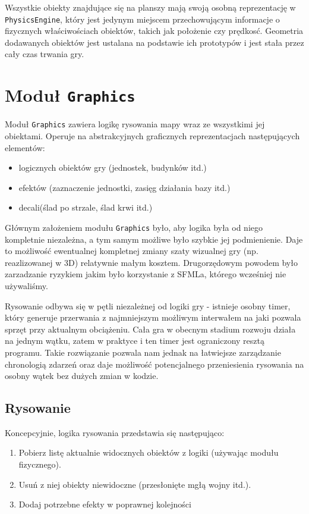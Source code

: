 \documentclass[licencjacka]{pracamgr}
\begin{document}
    Wszystkie obiekty znajdujące się na planszy mają swoją osobną reprezentację w \texttt{PhysicsEngine}, który jest jedynym miejscem
    przechowującym informacje o fizycznych właściwościach obiektów, takich jak położenie czy prędkosć. Geometria dodawanych obiektów
    jest ustalana na podstawie ich prototypów i jest stała przez cały czas trwania gry.

  \section{Moduł \texttt{Graphics}}
    Moduł \texttt{Graphics} zawiera logikę rysowania mapy wraz ze wszystkimi jej obiektami. Operuje na
    abstrakcyjnych graficznych reprezentacjach następujących elementów:
    \begin{itemize}
     \item logicznych obiektów gry (jednostek, budynków itd.)
     \item efektów (zaznaczenie jednostki, zasięg działania bazy itd.)
     \item decali\protect\footnotemark (ślad po strzale, ślad krwi itd.)
    \end{itemize}

    Głównym założeniem modułu \texttt{Graphics} było, aby logika była od niego kompletnie niezależna, a tym samym możliwe
    było szybkie jej podmienienie. Daje to możliwość ewentualnej kompletnej zmiany szaty wizualnej gry (np. reazlizowanej w 3D)
    relatywnie małym kosztem. Drugorzędowym powodem było zarzadzanie ryzykiem jakim było korzystanie z SFMLa, którego wcześniej
    nie używaliśmy.

    Rysowanie odbywa się w pętli niezależnej od logiki gry - istnieje osobny timer, który generuje
    przerwania z najmniejszym możliwym interwałem na jaki pozwala sprzęt przy aktualnym obciążeniu. Cała gra w obecnym
    stadium rozwoju działa na jednym wątku, zatem w praktyce i ten timer jest ograniczony resztą programu. Takie
    rozwiązanie pozwala nam jednak na łatwiejsze zarządzanie chronologią zdarzeń oraz daje możliwość potencjalnego
    przeniesienia rysowania na osobny wątek bez dużych zmian w kodzie.

    \subsection{Rysowanie}
      Koncepcyjnie, logika rysowania przedstawia się następująco:
      \begin{enumerate}
       \item Pobierz listę aktualnie widocznych obiektów z logiki (używając modułu fizycznego).
       \item Usuń z niej obiekty niewidoczne (przesłonięte mgłą wojny itd.).
       \item Dodaj potrzebne efekty w poprawnej kolejności
      \end{enumerate}
\end{document}
